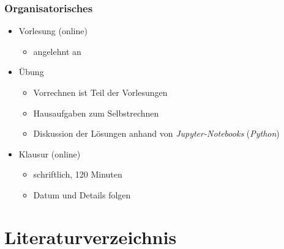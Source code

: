 \documentclass[hyperref={pdfpagemode=FullScreen, colorlinks=false}]{beamer}
\begin{document}
\begin{frame}
\frametitle{Organisatorisches}
    \begin{itemize}
        \item Vorlesung (online)
        \begin{itemize}
         \item angelehnt an \textsl{\cite{Verruijt2010, Vrettos2017, Schmidt2017}}
        \end{itemize}
        
        \item Übung
                \begin{itemize} 
                \item Vorrechnen ist Teil der Vorlesungen
                \item Hausaufgaben zum Selbstrechnen
                \item Diskussion der Lösungen anhand von \textsl{Jupyter-Notebooks} (\textsl{Python})
        \end{itemize}

        \item Klausur (online)
        \begin{itemize}
         \item schriftlich, 120 Minuten
         \item Datum und Details folgen
        \end{itemize}
    \end{itemize}

\end{frame}

\section*{Literaturverzeichnis}

\begin{frame}[allowframebreaks]{}
	\printbibliography
\end{frame}
\end{document}
